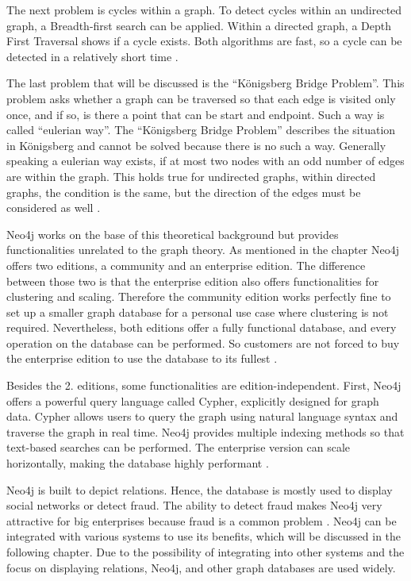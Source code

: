 The next problem is cycles within a graph. To detect cycles within an undirected graph, a Breadth-first search can be applied. Within a directed graph, a Depth First Traversal shows if a cycle exists. Both algorithms are fast, so a cycle can be detected in a relatively short time \parencite{graphCircle, cycle_directed}.

The last problem that will be discussed is the \enquote{Königsberg Bridge Problem}. This problem asks whether a graph can be traversed so that each edge is visited only once, and if so, is there a point that can be start and endpoint. Such a way is called \enquote{eulerian way}. The
\enquote{Königsberg Bridge Problem} describes the situation in Königsberg and cannot be solved because there is no such a way. Generally speaking a eulerian way exists, if at most two nodes with an odd number of edges are within the graph. This holds true for undirected graphs, within directed graphs, the condition is the same, but the direction of the edges must be considered as well \parencite{koenigsberger}.

Neo4j works on the base of this theoretical background but provides functionalities unrelated to the graph theory. As mentioned in the chapter  Neo4j offers two editions, a community and an enterprise edition. The difference between those two is that the enterprise edition also offers functionalities for clustering and scaling. Therefore the community edition works perfectly fine to set up a smaller
graph database for a personal use case where clustering is not required. Nevertheless, both editions offer a fully functional database, and every operation on the database can be performed. So customers are not forced to buy the enterprise edition to use the database to its fullest \parencite{Neo4jfeatures}.

Besides the 2. editions, some functionalities are edition-independent. First, Neo4j offers a powerful query language called Cypher, explicitly designed for graph data. Cypher allows users to query the graph using natural language syntax and traverse the graph in real time. Neo4j provides multiple indexing methods so that text-based searches can be performed.
The enterprise version can scale horizontally, making the database highly performant \parencite{Neo4jfeatures}.

Neo4j is built to depict relations. Hence, the database is mostly used to display social networks or detect fraud. The ability to detect fraud makes Neo4j very attractive for big enterprises because fraud is a common problem \parencite{Neo4jfeatures}. Neo4j can be integrated with various systems to use its benefits, which will be discussed in the following chapter. Due to the possibility of integrating into other systems and the focus on displaying relations, Neo4j, and other graph databases 
are used widely.

